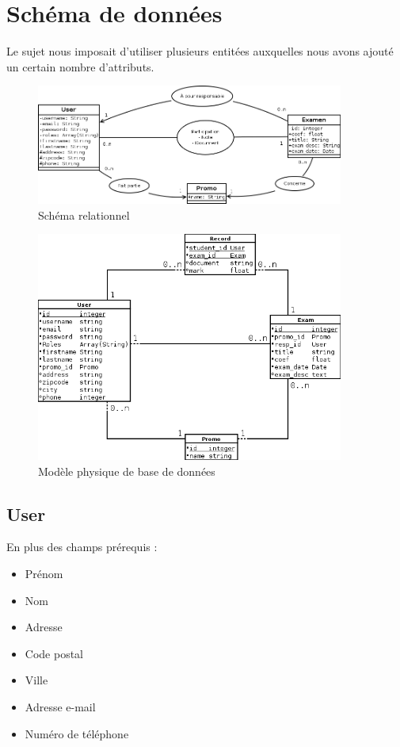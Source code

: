 \documentclass{report}
\begin{document}
  \section{Schéma de données}
    Le sujet nous imposait d'utiliser plusieurs entitées auxquelles nous avons ajouté un certain nombre d'attributs.

    \begin{figure}
      \caption{Schéma relationnel}
      \includegraphics[width=0.9\textwidth]{./data.png}
    \end{figure}

    \begin{figure}
      \caption{Modèle physique de base de données}
      \includegraphics[width=0.9\textwidth]{./db.png}
    \end{figure}

    \subsection{User}
      En plus des champs prérequis :
      \begin{itemize}
        \item{Prénom}
        \item{Nom}
        \item{Adresse}
        \item{Code postal}
        \item{Ville}
        \item{Adresse e-mail}
        \item{Numéro de téléphone}
      \end{itemize}
\end{document}
